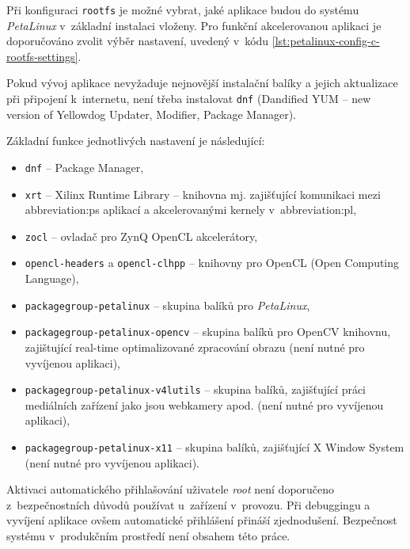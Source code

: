 \documentclass[a4paper, twoside, 11pt]{article}
\begin{document}
		Při konfiguraci \texttt{rootfs} je možné vybrat, jaké aplikace budou do systému \textit{PetaLinux} v~základní instalaci vloženy. Pro funkční akcelerovanou aplikaci je doporučováno zvolit výběr nastavení, uvedený v~kódu \ref{lst:petalinux-config-c-rootfs-settings}.\par
		Pokud vývoj aplikace nevyžaduje nejnovější instalační balíky a jejich aktualizace při připojení k~internetu, není třeba instalovat \texttt{dnf} (Dandified YUM – new version of Yellowdog Updater, Modifier, Package Manager).\par
		Základní funkce jednotlivých nastavení je následující:
		\begin{itemize}
			\item \texttt{dnf} – Package Manager,
			\item \texttt{xrt} – Xilinx Runtime Library – knihovna mj. zajišťující komunikaci mezi \gls{abbreviation:ps} aplikací a akcelerovanými kernely v~\gls{abbreviation:pl},
			\item \texttt{zocl} – ovladač pro ZynQ OpenCL akcelerátory,
			\item \texttt{opencl-headers} a \texttt{opencl-clhpp} – knihovny pro OpenCL (Open Computing Language),
			\item \texttt{packagegroup-petalinux} – skupina balíků pro \textit{PetaLinux},
			\item \texttt{packagegroup-petalinux-opencv} – skupina balíků pro OpenCV knihovnu, zajištující real-time optimalizované zpracování obrazu (není nutné pro vyvíjenou aplikaci),
			\item \texttt{packagegroup-petalinux-v4lutils} – skupina balíků, zajišťující práci mediálních zařízení jako jsou webkamery apod. (není nutné pro vyvíjenou aplikaci),
			\item \texttt{packagegroup-petalinux-x11} – skupina balíků, zajišťující X Window System (není nutné pro vyvíjenou aplikaci).
		\end{itemize}
		\vspace*{0.75cm}
		Aktivaci automatického přihlašování uživatele \textit{root} není doporučeno  z~bezpečnostních důvodů používat u~zařízení v~provozu. Při debuggingu a vyvíjení aplikace ovšem automatické přihlášení přináší zjednodušení. Bezpečnost systému v~produkčním prostředí není obsahem této práce.\par
\end{document}
